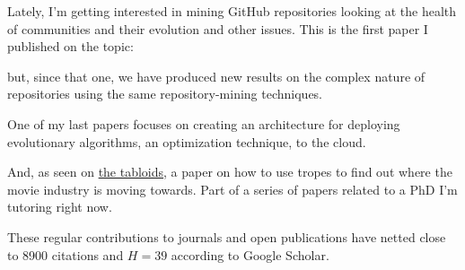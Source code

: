 \documentclass[]{friggeri-jj-cv}
\begin{document}
\cite{2014arXiv1403.3084G}

Lately, I'm getting interested in mining GitHub repositories looking
at the health of communities and their evolution and other
issues. This is the first paper I published on the topic:

\cite{2016arXiv160107862M}

but, since that one, we have produced new results on the complex
nature of repositories using the same repository-mining techniques.

One of my last papers focuses on creating an architecture for
deploying evolutionary algorithms, an optimization technique, to the
cloud.

\cite{GARCIAVALDEZ2021234}

And, as seen on
\href{https://www.dailymail.co.uk/sciencetech/article-9423885/COMPUTERS-soon-write-film-scripts-analysing-popular-movie-tropes.html}{the
  tabloids}, a paper on how to use tropes to find out where the movie
industry is moving towards. Part of a series of papers related to a
PhD I'm tutoring right now.

\cite{10.1371/journal.pone.0248881}

These regular contributions to journals and open publications have
netted close to 8900 citations  and $H=39$ according to Google Scholar.

\end{document}
